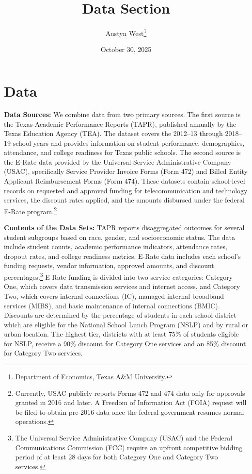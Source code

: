 


\begin{singlespace}
\title{Data Section}
\author{Austyn West\thanks{Department of Economics, Texas A\&M University.}}
\date{October 30, 2025}
\maketitle
\end{singlespace}

\section*{Data}

\textbf{Data Sources:} We combine data from two primary sources. The first source is the Texas Academic Performance Reports (TAPR), published annually by the Texas Education Agency (TEA). The dataset covers the 2012--13 through 2018--19 school years and provides information on student performance, demographics, attendance, and college readiness for Texas public schools. The second source is the E-Rate data provided by the Universal Service Administrative Company (USAC), specifically Service Provider Invoice Forms (Form 472) and Billed Entity Applicant Reimbursement Forms (Form 474). These datasets contain school-level records on requested and approved funding for telecommunication and technology services, the discount rates applied, and the amounts disbursed under the federal E-Rate program.\footnote{Currently, USAC publicly reports Forms 472 and 474 data only for approvals granted in 2016 and later. A Freedom of Information Act (FOIA) request will be filed to obtain pre-2016 data once the federal government resumes normal operations.}

\textbf{Contents of the Data Sets:} TAPR reports disaggregated outcomes for several student subgroups based on race, gender, and socioeconomic status. The data include student counts, academic performance indicators, attendance rates, dropout rates, and college readiness metrics. E-Rate data includes each school's funding requests, vendor information, approved amounts, and discount percentages.\footnote{The Universal Service Administrative Company (USAC) and the Federal Communications Commission (FCC) require an upfront competitive bidding period of at least 28 days for both Category One and Category Two services.} E-Rate funding is divided into two service categories: Category One, which covers data transmission services and internet access, and Category Two, which covers internal connections (IC), managed internal broadband services (MIBS), and basic maintenance of internal connections (BMIC). Discounts are determined by the percentage of students in each school district which are eligible for the National School Lunch Program (NSLP) and by rural or urban location. The highest tier, districts with at least 75\% of students eligible for NSLP, receive a 90\% discount for Category One services and an 85\% discount for Category Two services.

